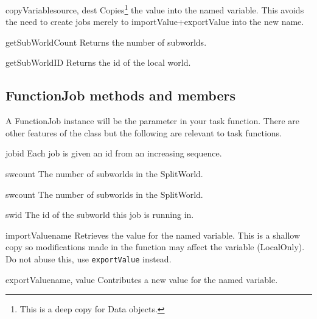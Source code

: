 \begin{methoddesc}[SplitWorld]{copyVariable}{source, dest}
Copies\footnote{ This is a deep copy for Data objects.} the value into the named variable.
This avoids the need to create jobs merely to importValue+exportValue into the new name.
\end{methoddesc}

\begin{methoddesc}[SplitWorld]{getSubWorldCount}{}
Returns the number of subworlds.
\end{methoddesc}

\begin{methoddesc}[SplitWorld]{getSubWorldID}{}
Returns the id of the local world.
\end{methoddesc}

\subsection{FunctionJob methods and members}
A FunctionJob instance will be the  parameter in your task function.
There are other features of the class but the following are relevant to task functions.


\begin{memberdesc}[FunctionJob]{jobid}
Each job is given an id from an increasing sequence.
\end{memberdesc}

\begin{memberdesc}[FunctionJob]{swcount}
The number of subworlds in the SplitWorld. 
\end{memberdesc}

\begin{memberdesc}[FunctionJob]{swcount}
The number of subworlds in the SplitWorld. 
\end{memberdesc}

\begin{memberdesc}[FunctionJob]{swid}
The id of the subworld this job is running in.
\end{memberdesc}

\begin{methoddesc}[FunctionJob]{importValue}{name}
Retrieves the value for the named variable.
This is a shallow copy so modifications made in the function may affect the variable (LocalOnly). 
Do not abuse this, use \texttt{exportValue} instead.
\end{methoddesc}

\begin{methoddesc}[FunctionJob]{exportValue}{name, value}
Contributes a new value for the named variable.
\end{methoddesc}
